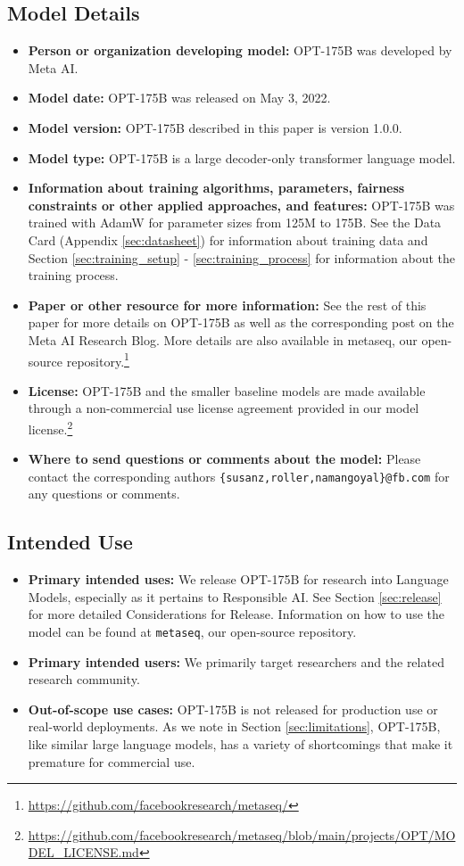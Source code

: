 \documentclass[11pt]{article}
\newcommand{\OPT}[0]{{OPT-175B}}
\begin{document}
\subsection{Model Details}
\begin{itemize}
    \item \textbf{Person or organization developing model:} \OPT{} was developed by Meta AI.
    \item \textbf{Model date:} \OPT{} was released on May 3, 2022.
    \item \textbf{Model version:} \OPT{} described in this paper is version 1.0.0.
    \item \textbf{Model type:} \OPT{} is a large decoder-only transformer language model.
    \item \textbf{Information about training algorithms, parameters, fairness constraints or other applied approaches, and features:} \OPT{} was trained with AdamW for parameter sizes from 125M to 175B. See the Data Card (Appendix \ref{sec:datasheet}) for information about training data and Section \ref{sec:training_setup} - \ref{sec:training_process} for information about the training process. 
    \item \textbf{Paper or other resource for more information:} See the rest of this paper for more details on \OPT{} as well as the corresponding post on the Meta AI Research Blog. More details are also available in metaseq, our open-source repository.\footnote{\url{https://github.com/facebookresearch/metaseq/}}
    \item \textbf{License:} \OPT{} and the smaller baseline models are made available through a non-commercial use license agreement provided in our model license.\footnote{\url{https://github.com/facebookresearch/metaseq/blob/main/projects/OPT/MODEL_LICENSE.md}}
    \item \textbf{Where to send questions or comments about the model:} Please contact the corresponding authors \texttt{\{susanz,roller,namangoyal\}@fb.com} for any questions or comments.
\end{itemize}


\subsection{Intended Use}
\begin{itemize}
    \item \textbf{Primary intended uses:} We release \OPT{} for research into Language Models, especially as it pertains to Responsible AI. See Section \ref{sec:release} for more detailed Considerations for Release. Information on how to use the model can be found at \texttt{metaseq}, our open-source repository.
    \item \textbf{Primary intended users:} We primarily target researchers and the related research community.
    \item \textbf{Out-of-scope use cases: } \OPT{} is not released for production use or real-world deployments. As we note in Section \ref{sec:limitations}, \OPT{}, like similar large language models, has a variety of shortcomings that make it premature for commercial use.
\end{itemize}
 
\end{document}
